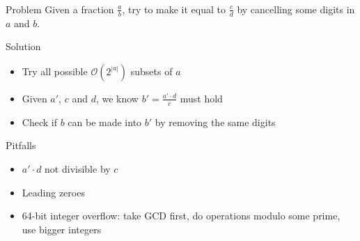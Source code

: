\begin{frame}
    \frametitle{\problemtitle}
    \begin{block}{Problem}
        Given a fraction $\frac{a}{b}$,
        try to make it equal to $\frac{c}{d}$ by
        cancelling some digits in $a$ and $b$.
    \end{block}
    \pause
    \begin{block}{Solution}
      \begin{itemize}
      \item Try all possible $\mathcal O(2^{\left|a\right|})$ subsets of $a$
      \item Given $a'$, $c$ and $d$, we know $b' = \frac{a' \cdot d}{c}$ must hold
      \item Check if $b$ can be made into $b'$ by removing the same digits
      \end{itemize}
    \end{block}
    \pause
    \begin{block}{Pitfalls}
      \begin{itemize}
      \item $a' \cdot d$ not divisible by $c$
      \item Leading zeroes
      \item 64-bit integer overflow: take GCD first, do operations modulo some prime, use bigger integers
      \end{itemize}
    \end{block}
    \pause
    \solvestats
\end{frame}
